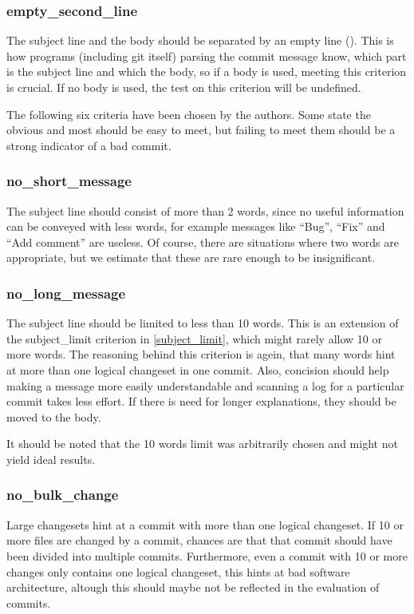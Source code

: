 \subsubsection{empty\_second\_line}
\label{subs:empty_second_line}
The subject line and the body should be separated by an empty line (\cite{TP}). This is how programs (including git itself) parsing the commit message know, which part is the subject line and which the body, so if a body is used, meeting this criterion is crucial. If no body is used, the test on this criterion will be undefined.

The following six criteria have been chosen by the authors. Some state the obvious and most should be easy to meet, but failing to meet them should be a strong indicator of a bad commit.

\subsubsection{no\_short\_message}
\label{subs:no_short_message}
The subject line should consist of more than 2 words, since no useful information can be conveyed with less words, for example messages like ``Bug'', ``Fix'' and ``Add comment'' are useless. Of course, there are situations where two words are appropriate, but we estimate that these are rare enough to be insignificant.

\subsubsection{no\_long\_message}
\label{subs:no_long_message}
The subject line should be limited to less than 10 words. This is an extension of the subject\_limit criterion in \ref{subject_limit}, which might rarely allow 10 or more words. The reasoning behind this criterion is agein, that many words hint at more than one logical changeset in one commit. Also, concision should help making a message more easily understandable and scanning a log for a particular commit takes less effort. If there is need for longer explanations, they should be moved to the body.

It should be noted that the 10 words limit was arbitrarily chosen and might not yield ideal results.

\subsubsection{no\_bulk\_change}
\label{subs:no_bulk_change}
Large changesets hint at a commit with more than one logical changeset. If 10 or more files are changed by a commit, chances are that that commit should have been divided into multiple commits. Furthermore, even a commit with 10 or more changes only contains one logical changeset, this hints at bad software architecture, altough this should maybe not be reflected in the evaluation of commits.

